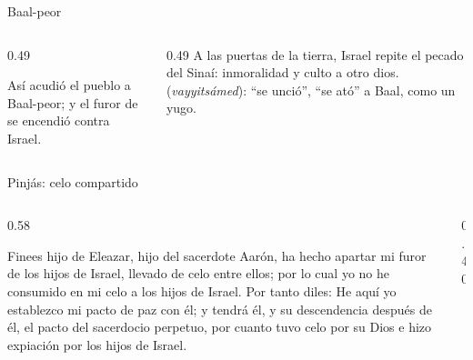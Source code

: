 \begin{frame}{Baal-peor}
\centering
{}\par\medskip
\begin{columns}[t,onlytextwidth]
\begin{column}{0.49\textwidth}
\begin{cita}Así acudió el pueblo a Baal-peor; y el furor de \SENOR{} se encendió contra Israel.\end{cita}
\end{column}
\begin{column}{0.49\textwidth}\small
A las puertas de la tierra, Israel repite el pecado del Sinaí: inmoralidad y culto a otro dios.  (\emph{vayyitsámed}): ``se unció'', ``se ató'' a Baal, como un yugo.
\end{column}
\end{columns}
\end{frame}

\begin{frame}{Pinjás: celo compartido}
\begin{columns}[c,onlytextwidth]
\begin{column}{0.58\textwidth}
\begin{cita}Finees hijo de Eleazar, hijo del sacerdote Aarón, ha hecho apartar mi furor de los hijos de Israel, llevado de celo entre ellos; por lo cual yo no he consumido en mi celo a los hijos de Israel. Por tanto diles: He aquí yo establezco mi pacto de paz con él; y tendrá él, y su descendencia después de él, el pacto del sacerdocio perpetuo, por cuanto tuvo celo por su Dios e hizo expiación por los hijos de Israel.\end{cita}
\end{column}
\begin{column}{0.40\textwidth}\end{column}
\end{columns}
\end{frame}

